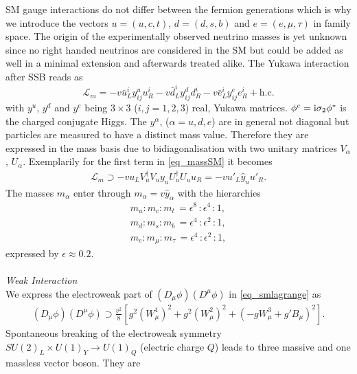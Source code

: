 SM gauge interactions do not differ between the fermion generations which is why we introduce the vectors
$u=(u,c,t)$, $d=(d,s,b)$ and $e=(e,\mu,\tau)$ in family space. The origin of the experimentally observed neutrino masses is yet unknown since
no right handed neutrinos are considered in the SM but could be added as well in a minimal extension and afterwards treated alike.
The Yukawa interaction after SSB reads as
\begin{equation}
 \mathcal{L}_m = -v \bar u^i_L y^u_{ij}u^i_R -v \bar d^i_Ly^d_{ij} d^i_R -v \bar e^i_Ly^e_{ij} e^i_R + \text{h.c.}
 \label{eq_massSM}
\end{equation}
with $y^u$, $y^d$ and $y^e$ being $3\times 3$ ($i,j=1,2,3$) real, Yukawa matrices. $\phi^c = \text{i}\sigma_2\phi^*$ is the charged conjugate 
Higgs. 
The $y^\alpha$, ($\alpha=u,d,e$) are in general not diagonal but particles are measured to have a distinct mass value. Therefore they are expressed
in the mass basis due to bidiagonalisation with two unitary matrices $V_\alpha$, $U_\alpha$. Exemplarily for the first term in \eqref{eq_massSM}
it becomes
\begin{align}
 \mathcal{L}_m \supset -v u_L V_u^\dagger V_u y_u U^\dagger_u U_u u_R = -v u'_L \hat{y}_u u'_R.
 \label{eq_diracmass}
\end{align}
The masses $m_\alpha$ enter through $m_\alpha = v\hat{y}_\alpha$ with the hierarchies
\begin{equation}
\begin{aligned}
 m_u:m_c:m_t\,=\epsilon^8\,:\epsilon^4\,:1,\\
 m_d:m_s:m_b\,=\epsilon^4\,:\epsilon^2\,:1,\\
 m_e:m_\mu:m_\tau\, = \epsilon^4\,:\epsilon^2\,:1,
\end{aligned}
 \label{eq_masshierarchy}
\end{equation}
expressed by $\epsilon\approx0.2$. 
\\ \\ \textit{Weak Interaction}\\
\noindent We express the electroweak part of $\left(D_\mu\phi\right)\left(D^\mu\phi\right)$ in \eqref{eq_smlagrange} as
\begin{align}
 \left(D_\mu\phi\right)\left(D^\mu\phi\right) \supset \frac{v^2}{8} \left[g^2(W^1_\mu)^2 + g^2(W^2_\mu)^2 + (-gW^3_\mu+g'B_\mu)^2\right].
\end{align}
Spontaneous breaking of the electroweak symmetry $SU(2)_L\times U(1)_Y\rightarrow U(1)_Q$ (electric charge $Q$) leads to three massive
and one massless vector boson. They are
